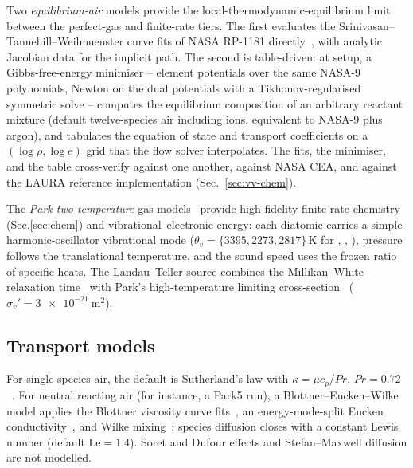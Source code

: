 \documentclass[journal,biblatex]{new-aiaa}
\begin{document}
Two \emph{equilibrium-air} models provide the local-thermodynamic-equilibrium limit between the perfect-gas and finite-rate tiers. The first evaluates the Srinivasan--Tannehill--Weilmuenster curve fits of NASA RP-1181 directly~\cite{srinivasan_simplified_1987}, with analytic Jacobian data for the implicit path. The second is table-driven: at setup, a Gibbs-free-energy minimiser -- element potentials over the same NASA-9 polynomials, Newton on the dual potentials with a Tikhonov-regularised symmetric solve -- computes the equilibrium composition of an arbitrary reactant mixture (default twelve-species air including ions, equivalent to NASA-9 plus argon), and tabulates the equation of state and transport coefficients on a $(\log\rho,\log e)$ grid that the flow solver interpolates. The fits, the minimiser, and the table cross-verify against one another, against NASA CEA, and against the LAURA reference implementation (Sec.~\ref{sec:vv-chem}). 

The \emph{Park two-temperature} gas models~\cite{park_nonequilibrium_1989,park_review_1993} provide high-fidelity finite-rate chemistry (Sec.\ref{sec:chem}) and vibrational--electronic energy: each diatomic carries a simple-harmonic-oscillator vibrational mode ($\theta_v=\{3395,2273,2817\}\,\unit{\K}$ for , , ), pressure follows the translational temperature, and the sound speed uses the frozen ratio of specific heats. The Landau--Teller source combines the Millikan--White relaxation time~\cite{millikan_systematics_1963} with Park's high-temperature limiting cross-section~\cite{park_review_1993} ($\sigma_v'=\qty{3e-21}{\m\squared}$).

\subsection{Transport models}

For single-species air, the default is Sutherland's law with $\kappa=\mu c_p/Pr$, $Pr=0.72$~\cite{sutherland_viscosity_1893,white_viscous_2005}. For neutral reacting air (for instance, a Park5 run), a Blottner--Eucken--Wilke model applies the Blottner viscosity curve fits~\cite{blottner_chemically_1971}, an energy-mode-split Eucken conductivity~\cite{eucken_uber_1913,svehla_estimated_1963}, and Wilke mixing~\cite{wilke_viscosity_1950}; species diffusion closes with a constant Lewis number (default $\mathrm{Le}=1.4$). Soret and Dufour effects and Stefan--Maxwell diffusion are not modelled.
\end{document}
